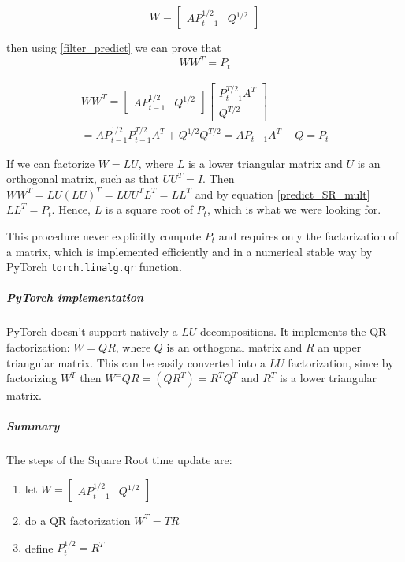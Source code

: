 \documentclass{article}
\begin{document}
\begin{equation}
    W = \begin{bmatrix}AP_{t-1}^{1/2} & Q^{1/2}\end{bmatrix}
\end{equation}

then using \ref{filter_predict} we can prove that
\begin{equation}\label{predict_SR_mult}
WW^T = P_t 
\end{equation}

\begin{multline}
  WW^T =  \begin{bmatrix}AP_{t-1}^{1/2} & Q^{1/2}\end{bmatrix}\begin{bmatrix}P_{t-1}^{T/2}A^T \\ Q^{T/2}\end{bmatrix}\\
  = AP_{t-1}^{1/2}P_{t-1}^{T/2}A^T + Q^{1/2}Q^{T/2} = AP_{t-1}A^T + Q = P_t
\end{multline}

If we  can factorize $W=LU$, where $L$ is a lower triangular matrix and $U$ is an orthogonal matrix, such as that $UU^T = I$. Then $WW^T = LU(LU)^T = LUU^TL^T = LL^T$ and by equation \ref{predict_SR_mult} $LL^T=P_t$. Hence, $L$ is a square root of $P_t$, which is what we were looking for.

This procedure never explicitly compute $P_t$ and requires only the factorization of a matrix, which is implemented efficiently and in a numerical stable way by PyTorch \verb|torch.linalg.qr| function. 

\subparagraph{PyTorch implementation} PyTorch doesn't support natively a $LU$ decompositions. It implements the QR factorization: $W=QR$, where $Q$ is an orthogonal matrix and $R$ an upper triangular matrix. This can be easily converted into a $LU$ factorization, since by factorizing $W^T$ then $W^=QR=(QR^T)=R^TQ^T$ and $R^T$ is a lower triangular matrix.

\subparagraph{Summary} The steps of the Square Root time update are:

\begin{enumerate}
    \item let  $W = \begin{bmatrix}AP_{t-1}^{1/2} & Q^{1/2}\end{bmatrix}$
    \item do a QR factorization $W^T=TR$
    \item define $P_t^{1/2} = R^T$
\end{enumerate}
\end{document}
